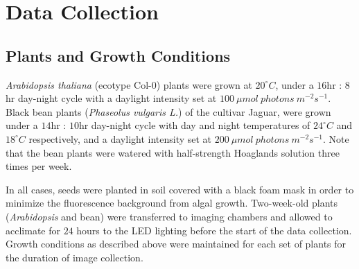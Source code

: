 \section{Data Collection}
\label{sec:2}

\subsection{Plants and Growth Conditions}

{\it Arabidopsis thaliana} (ecotype Col-0) plants were grown at $20^{\circ}C$, under a $16$hr : $8$hr day-night cycle with a daylight intensity set at $100~\mu mol~photons~m^{-2} s^{-1}$.
%
Black bean plants ({\it Phaseolus vulgaris L.}) of the cultivar Jaguar, were grown under a $14$hr : $10$hr day-night cycle with day and night temperatures of $24^{\circ}C$ and $18^{\circ}C$ respectively, and a daylight intensity set at $200~\mu mol~photons~m^{-2} s^{-1}$.
%
Note that the bean plants were watered with half-strength Hoaglands solution three times per week.

In all cases, seeds were planted in soil covered with a black foam mask in order to minimize the fluorescence background from algal growth.
%
Two-week-old plants ({\it Arabidopsis} and bean) were transferred to imaging chambers and allowed to acclimate for $24$ hours to the LED lighting before the start of the data collection.
Growth conditions as described above were maintained for each set of plants for the duration of image collection.

